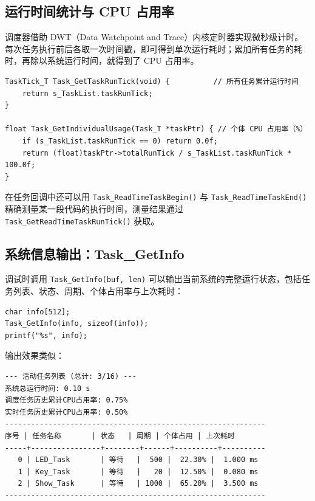 \subsection{运行时间统计与 CPU 占用率}

调度器借助 DWT（Data Watchpoint and Trace）内核定时器实现微秒级计时。每次任务执行前后各取一次时间戳，即可得到单次运行耗时；累加所有任务的耗时，再除以系统运行时间，就得到了 CPU 占用率。

\begin{lstlisting}[style=c]
TaskTick_T Task_GetTaskRunTick(void) {          // 所有任务累计运行时间
    return s_TaskList.taskRunTick;
}

float Task_GetIndividualUsage(Task_T *taskPtr) { // 个体 CPU 占用率（%）
    if (s_TaskList.taskRunTick == 0) return 0.0f;
    return (float)taskPtr->totalRunTick / s_TaskList.taskRunTick * 100.0f;
}
\end{lstlisting}

在任务回调中还可以用 \texttt{Task\_ReadTimeTaskBegin()} 与 \texttt{Task\_ReadTimeTaskEnd()} 精确测量某一段代码的执行时间，测量结果通过 \texttt{Task\_GetReadTimeTaskRunTick()} 获取。

\subsection{系统信息输出：Task\_GetInfo}

调试时调用 \texttt{Task\_GetInfo(buf, len)} 可以输出当前系统的完整运行状态，包括任务列表、状态、周期、个体占用率与上次耗时：

\begin{lstlisting}[style=c]
char info[512];
Task_GetInfo(info, sizeof(info));
printf("%s", info);
\end{lstlisting}

输出效果类似：

\begin{lstlisting}[style=c]
--- 活动任务列表 (总计: 3/16) ---
系统总运行时间: 0.10 s
调度任务历史累计CPU占用率: 0.75%
实时任务历史累计CPU占用率: 0.50%
------------------------------------------------------------
序号 | 任务名称       | 状态   | 周期 | 个体占用 | 上次耗时
-----+----------------+--------+------+----------+----------
   0 | LED_Task       | 等待   |  500 |  22.30% |  1.000 ms
   1 | Key_Task       | 等待   |   20 |  12.50% |  0.080 ms
   2 | Show_Task      | 等待   | 1000 |  65.20% |  3.500 ms
------------------------------------------------------------
\end{lstlisting}

